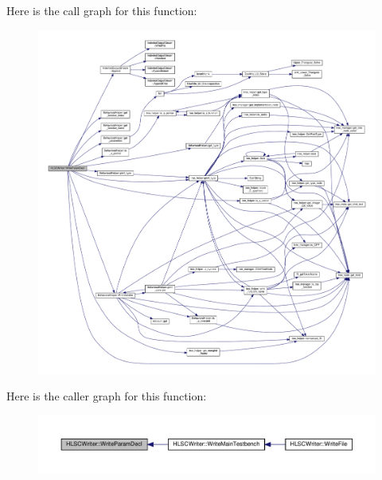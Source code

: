 Here is the call graph for this function\+:
\nopagebreak
\begin{figure}[H]
\begin{center}
\leavevmode
\includegraphics[width=350pt]{d4/db1/classHLSCWriter_a7b7f749a967e9b84acd3488413a31c02_cgraph}
\end{center}
\end{figure}
Here is the caller graph for this function\+:
\nopagebreak
\begin{figure}[H]
\begin{center}
\leavevmode
\includegraphics[width=350pt]{d4/db1/classHLSCWriter_a7b7f749a967e9b84acd3488413a31c02_icgraph}
\end{center}
\end{figure}
\mbox{\label{classHLSCWriter_ae9413ea7c35fc3eec7417fd0cf2a5b14}} 
